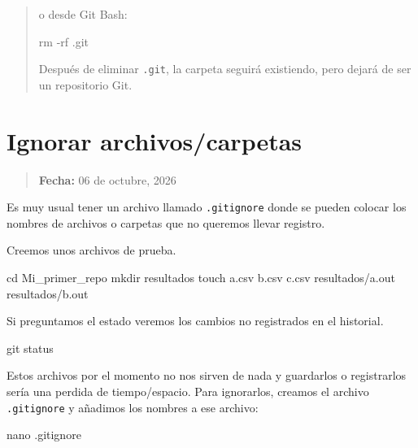 \documentclass[
  spanish,
  12pt,
  letterpaper,
  DIV=11,
  numbers=noendperiod]{scrreprt}
\newenvironment{Shaded}{\begin{snugshade}}{\end{snugshade}}
\newcommand{\AttributeTok}[1]{\textcolor[rgb]{0.40,0.45,0.13}{#1}}
\newcommand{\BuiltInTok}[1]{\textcolor[rgb]{0.00,0.23,0.31}{#1}}
\newcommand{\FunctionTok}[1]{\textcolor[rgb]{0.28,0.35,0.67}{#1}}
\newcommand{\NormalTok}[1]{\textcolor[rgb]{0.00,0.23,0.31}{#1}}
\begin{document}
\begin{tcolorbox}
\begin{quote}
o desde Git Bash:

\begin{Shaded}
\begin{Highlighting}[]
\FunctionTok{rm} \AttributeTok{{-}rf}\NormalTok{ .git}
\end{Highlighting}
\end{Shaded}

Después de eliminar \texttt{.git}, la carpeta seguirá existiendo, pero
dejará de ser un repositorio Git.
\end{quote}

\end{tcolorbox}

\chapter{Ignorar archivos/carpetas}\label{ignorar-archivoscarpetas}

\begin{quote}
\textbf{Fecha:} 06 de octubre, 2026
\end{quote}

Es muy usual tener un archivo llamado \texttt{.gitignore} donde se
pueden colocar los nombres de archivos o carpetas que no queremos llevar
registro.

Creemos unos archivos de prueba.

\begin{Shaded}
\begin{Highlighting}[]
\BuiltInTok{cd}\NormalTok{ Mi\_primer\_repo}
\FunctionTok{mkdir}\NormalTok{ resultados}
\FunctionTok{touch}\NormalTok{ a.csv b.csv c.csv resultados/a.out resultados/b.out}
\end{Highlighting}
\end{Shaded}

Si preguntamos el estado veremos los cambios no registrados en el
historial.

\begin{Shaded}
\begin{Highlighting}[]
\FunctionTok{git}\NormalTok{ status}
\end{Highlighting}
\end{Shaded}

Estos archivos por el momento no nos sirven de nada y guardarlos o
registrarlos sería una perdida de tiempo/espacio. Para ignorarlos,
creamos el archivo \texttt{.gitignore} y añadimos los nombres a ese
archivo:

\begin{Shaded}
\begin{Highlighting}[]
\FunctionTok{nano}\NormalTok{ .gitignore}
\end{Highlighting}
\end{Shaded}
\end{document}
